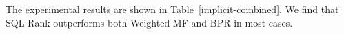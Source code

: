 \documentclass{article}
\begin{document}
The experimental results are shown in Table~\ref{implicit-combined}. We find that SQL-Rank outperforms both Weighted-MF and BPR in most cases. 



 


\end{document}
